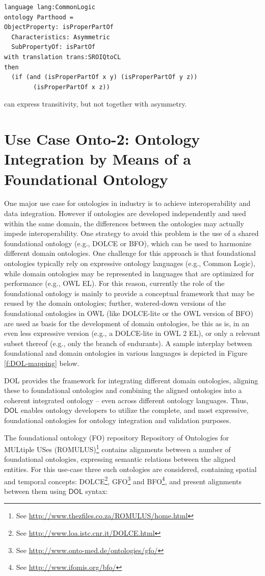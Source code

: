 \documentclass[10pt,fleqn,final]{scrreprt}
\newcommand*{\DOL}{\ensuremath{\mathsf{DOL}}\xspace}
\newenvironment{definitions}[0]{\medskip }{}
\begin{document}
\begin{definitions}
\begin{lstlisting}[basicstyle=\small\ttfamily,language=dolText,alsolanguage=clif,alsolanguage=owl2Manchester,escapechar=@,mathescape]
language lang:CommonLogic
ontology Parthood =
ObjectProperty: isProperPartOf  
  Characteristics: Asymmetric  
  SubPropertyOf: isPartOf 
with translation trans:SROIQtoCL
then
  (if (and (isProperPartOf x y) (isProperPartOf y z)) 
        (isProperPartOf x z))
\end{lstlisting}
\OWL can express transitivity, but not together with asymmetry.

\section{Use Case Onto-2: Ontology Integration by Means of a Foundational Ontology}
One major use case for ontologies in industry is to achieve interoperability and data integration. 
However if ontologies are developed independently and used  within the same domain, the 
differences between the ontologies may actually impede interoperability. One strategy to avoid this 
problem is the use of a shared  foundational ontology (e.g., DOLCE or BFO), which can be used to 
harmonize different domain ontologies. One challenge for this approach is that foundational 
ontologies typically rely on expressive ontology languages (e.g., Common Logic), while domain 
ontologies may be represented in languages that are optimized for performance (e.g., OWL EL). For 
this reason, currently the role of the foundational ontology is mainly to provide a conceptual 
framework that may be reused by the  domain ontologies; further, watered-down versions of the 
foundational ontologies in OWL (like DOLCE-lite or the OWL version of BFO) are used as basis for 
the  development of domain ontologies, be this as is, in an even less expressive version (e.g., a 
DOLCE-lite in OWL 2 EL), or only a relevant subset thereof (e.g., only the branch of endurants). A 
sample interplay between  foundational and domain ontologies in various 
languages is depicted in Figure \ref{f:DOL-mapping} below.

DOL  provides the framework for integrating different domain ontologies, aligning these to 
foundational ontologies \cite{DBLP:books/daglib/0032976,AlignmentAPI} and combining the aligned ontologies into a coherent 
integrated ontology -- even across different ontology languages. Thus, \DOL  enables ontology 
developers to utilize the complete, and most expressive, foundational ontologies for ontology 
integration and validation purposes. 

The foundational ontology (FO) repository Repository of Ontologies for MULtiple USes (ROMULUS)\footnote{See \url{http://www.thezfiles.co.za/ROMULUS/home.html}}
contains alignments between a number of foundational ontologies, expressing semantic relations between the aligned
entities.  For this use-case three such ontologies are considered, containing spatial and temporal concepts: DOLCE\footnote{See \url{http://www.loa.istc.cnr.it/DOLCE.html}}, GFO\footnote{See \url{http://www.onto-med.de/ontologies/gfo/}} and BFO\footnote{See \url{http://www.ifomis.org/bfo/}}, and present alignments between them 
using \DOL syntax:


\end{definitions}
\end{document}
